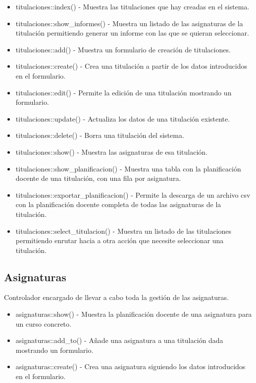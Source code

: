 \begin{itemize}
\item titulaciones::index() - Muestra las titulaciones que hay creadas en el sistema.
\item titulaciones::show\_informes() - Muestra un listado de las asignaturas de la titulación permitiendo generar un informe con las que se quieran seleccionar.
\item titulaciones::add() - Muestra un formulario de creación de titulaciones.
\item titulaciones::create() - Crea una titulación a partir de los datos introducidos en el formulario.
\item titulaciones::edit() - Permite la edición de una titulación mostrando un formulario.
\item titulaciones::update() - Actualiza los datos de una titulación existente.
\item titulaciones::delete() - Borra una titulación del sistema.
\item titulaciones::show() - Muestra las asignaturas de esa titulación.
\item titulaciones::show\_planificacion() - Muestra una tabla con la planificación docente de una titulación, con una fila por asignatura.
\item titulaciones::exportar\_planificacion() - Permite la descarga de un archivo csv con la planificación docente completa de todas las asignaturas de la titulación.
\item titulaciones::select\_titulacion() - Muestra un listado de las titulaciones permitiendo enrutar hacia a otra acción que necesite seleccionar una titulación.
\end{itemize}

\subsection{Asignaturas}
Controlador encargado de llevar a cabo toda la gestión de las asignaturas.

\begin{itemize}
\item asignaturas::show() - Muestra la planificación docente de una asignatura para un curso concreto.
\item asignaturas::add\_to() - Añade una asignatura a una titulación dada mostrando un formulario.
\item asignaturas::create() - Crea una asignatura siguiendo los datos introducidos en el formulario.
\end{itemize}

